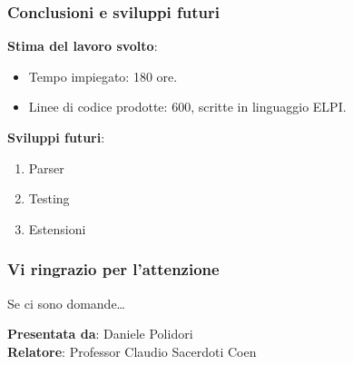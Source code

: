 \documentclass{beamer}
\begin{document}
\begin{frame}

 \frametitle{Conclusioni e sviluppi futuri}

 \textbf{Stima del lavoro svolto}:
 \begin{itemize}
  \item Tempo impiegato: 180 ore.
  \item Linee di codice prodotte: 600, scritte in linguaggio ELPI.
 \end{itemize}

 \vfill

 \textbf{Sviluppi futuri}:
 \begin{enumerate}
  \item Parser
  \item Testing
  \item Estensioni
 \end{enumerate}

\end{frame}


\begin{frame}

 \frametitle{Vi ringrazio per l'attenzione}

 Se ci sono domande\ldots

 \vfill

 \begin{flushright}
  \textbf{Presentata da}: Daniele Polidori\\
  \textbf{Relatore}: Professor Claudio Sacerdoti Coen
 \end{flushright}

\end{frame}


\begin{frame}

 \frametitle{}


\end{frame}


\begin{frame}

 \frametitle{}


\end{frame}
\end{document}
